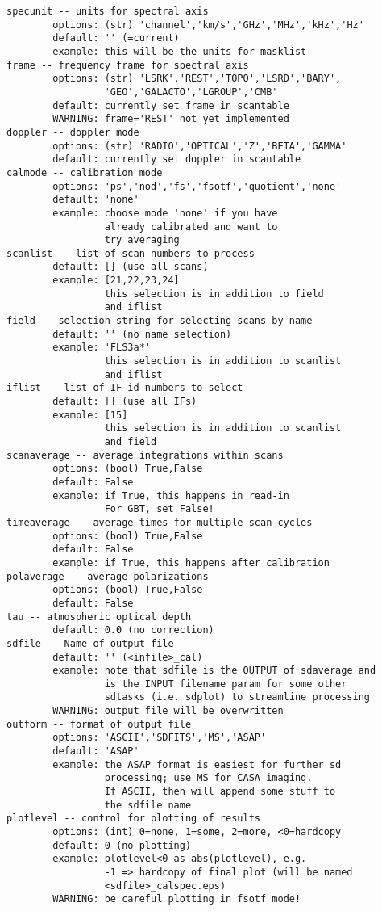 \begin{verbatim}
specunit -- units for spectral axis
        options: (str) 'channel','km/s','GHz','MHz','kHz','Hz'
        default: '' (=current)
        example: this will be the units for masklist
frame -- frequency frame for spectral axis
        options: (str) 'LSRK','REST','TOPO','LSRD','BARY',
                 'GEO','GALACTO','LGROUP','CMB'
        default: currently set frame in scantable
        WARNING: frame='REST' not yet implemented
doppler -- doppler mode
        options: (str) 'RADIO','OPTICAL','Z','BETA','GAMMA'
        default: currently set doppler in scantable
calmode -- calibration mode
        options: 'ps','nod','fs','fsotf','quotient','none'
        default: 'none'
        example: choose mode 'none' if you have
                 already calibrated and want to
                 try averaging
scanlist -- list of scan numbers to process
        default: [] (use all scans)
        example: [21,22,23,24]
                 this selection is in addition to field
                 and iflist
field -- selection string for selecting scans by name
        default: '' (no name selection)
        example: 'FLS3a*'
                 this selection is in addition to scanlist
                 and iflist
iflist -- list of IF id numbers to select
        default: [] (use all IFs)
        example: [15]
                 this selection is in addition to scanlist
                 and field
scanaverage -- average integrations within scans
        options: (bool) True,False
        default: False
        example: if True, this happens in read-in
                 For GBT, set False!
timeaverage -- average times for multiple scan cycles
        options: (bool) True,False
        default: False
        example: if True, this happens after calibration
polaverage -- average polarizations
        options: (bool) True,False
        default: False
tau -- atmospheric optical depth
        default: 0.0 (no correction)
sdfile -- Name of output file
        default: '' (<infile>_cal)
        example: note that sdfile is the OUTPUT of sdaverage and
                 is the INPUT filename param for some other
                 sdtasks (i.e. sdplot) to streamline processing
        WARNING: output file will be overwritten
outform -- format of output file
        options: 'ASCII','SDFITS','MS','ASAP'
        default: 'ASAP'
        example: the ASAP format is easiest for further sd
                 processing; use MS for CASA imaging.
                 If ASCII, then will append some stuff to
                 the sdfile name
plotlevel -- control for plotting of results
        options: (int) 0=none, 1=some, 2=more, <0=hardcopy
        default: 0 (no plotting)
        example: plotlevel<0 as abs(plotlevel), e.g.
                 -1 => hardcopy of final plot (will be named
                 <sdfile>_calspec.eps)
        WARNING: be careful plotting in fsotf mode!
\end{verbatim}

